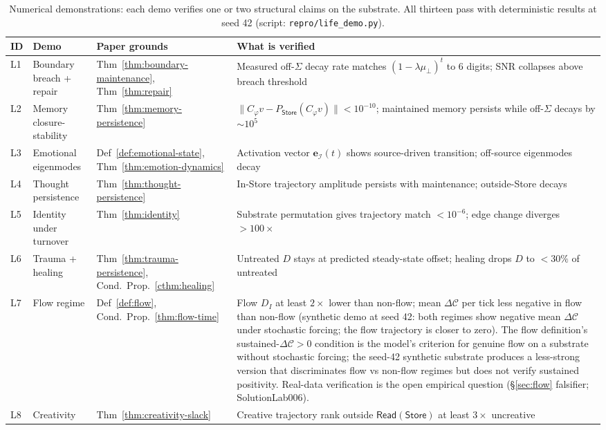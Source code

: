 \documentclass[11pt]{article}
\theoremstyle{plain}
\theoremstyle{definition}
\theoremstyle{remark}
\newcommand{\Ical}{\mathcal{I}}
\newcommand{\Ccal}{\mathcal{C}}
\begin{document}
\begin{table}[h]
\centering
\small
\caption{Numerical demonstrations: each demo verifies one or two structural claims on the substrate. All thirteen pass with deterministic results at seed 42 (script: \texttt{repro/life\_demo.py}).}\label{tab:numerical-demos}
\begin{tabular}{p{0.8cm}p{4cm}p{3.4cm}p{4.8cm}}
\toprule
ID & Demo & Paper grounds & What is verified \\
\midrule
L1 & Boundary breach + repair & Thm~\ref{thm:boundary-maintenance}, Thm~\ref{thm:repair} & Measured off-$\Sigma$ decay rate matches $(1-\lambda\mu_\perp)^t$ to 6 digits; SNR collapses above breach threshold \\
L2 & Memory closure-stability & Thm~\ref{thm:memory-persistence} & $\|C_\varphi v - P_{\mathsf{Store}}(C_\varphi v)\| < 10^{-10}$; maintained memory persists while off-$\Sigma$ decays by $\sim 10^{5}$ \\
L3 & Emotional eigenmodes & Def~\ref{def:emotional-state}, Thm~\ref{thm:emotion-dynamics} & Activation vector $\mathbf{e}_\Ical(t)$ shows source-driven transition; off-source eigenmodes decay \\
L4 & Thought persistence & Thm~\ref{thm:thought-persistence} & In-Store trajectory amplitude persists with maintenance; outside-Store decays \\
L5 & Identity under turnover & Thm~\ref{thm:identity} & Substrate permutation gives trajectory match $< 10^{-6}$; edge change diverges $> 100\times$ \\
L6 & Trauma + healing & Thm~\ref{thm:trauma-persistence}, Cond.~Prop.~\ref{cthm:healing} & Untreated $D$ stays at predicted steady-state offset; healing drops $D$ to $< 30\%$ of untreated \\
L7 & Flow regime & Def~\ref{def:flow}, Cond.~Prop.~\ref{thm:flow-time} & Flow $D_I$ at least $2\times$ lower than non-flow; mean $\Delta\Ccal$ per tick less negative in flow than non-flow (synthetic demo at seed 42: both regimes show negative mean $\Delta\Ccal$ under stochastic forcing; the flow trajectory is closer to zero). The flow definition's sustained-$\Delta\Ccal > 0$ condition is the model's criterion for genuine flow on a substrate without stochastic forcing; the seed-42 synthetic substrate produces a less-strong version that discriminates flow vs non-flow regimes but does not verify sustained positivity. Real-data verification is the open empirical question (\S\ref{sec:flow} falsifier; SolutionLab006). \\
L8 & Creativity & Thm~\ref{thm:creativity-slack} & Creative trajectory rank outside $\mathsf{Read}(\mathsf{Store})$ at least $3\times$ uncreative \\

\end{tabular}
\end{table}
\end{document}
